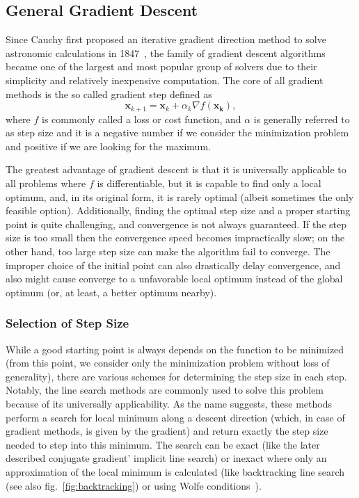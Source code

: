 \subsection{General Gradient Descent}
Since Cauchy first proposed an iterative gradient direction method to solve astronomic calculations in 1847~\cite{cauchy_methode_1847}, the family of gradient descent algorithms became one of the largest and most popular group of solvers due to their simplicity and relatively inexpensive computation. The core of all gradient methods is the so called gradient step defined as
\[\mathbf{x}_{k+1} = \mathbf{x}_k + \alpha_k \nabla f(\mathbf{x_k}),\]
where $f$ is commonly called a loss or cost function, and $\alpha$ is generally referred to as step size and it is a negative number if we consider the minimization problem and positive if we are looking for the maximum.

The greatest advantage of gradient descent is that it is universally applicable to all problems where $f$ is differentiable, but it is capable to find only a local optimum, and, in its original form, it is rarely optimal (albeit sometimes the only feasible option). Additionally, finding the optimal step size and a proper starting point is quite challenging, and convergence is not always guaranteed. If the step size is too small then the convergence speed becomes impractically slow; on the other hand, too large step size can make the algorithm fail to converge. The improper choice of the initial point can also drastically delay convergence, and also might cause converge to a unfavorable local optimum instead of the global optimum (or, at least, a better optimum nearby).

\subsubsection{Selection of Step Size}
While a good starting point is always depends on the function to be minimized (from this point, we consider only the minimization problem without loss of generality), there are various schemes for determining the step size in each step. Notably, the line search methods are commonly used to solve this problem because of its universally applicability. As the name suggests, these methods perform a search for local minimum along a descent direction (which, in case of gradient methods, is given by the gradient) and return exactly the step size needed to step into this minimum. The search can be exact (like the later described conjugate gradient' implicit line search) or inexact where only an approximation of the local minimum is calculated (like backtracking line search~\cite{armijo_minimization_1966} (see also fig.~\ref{fig:backtracking}) or using Wolfe conditions~\cite{wolfe_convergence_1969}).

